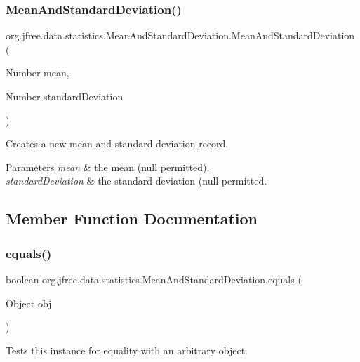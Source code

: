 \subsubsection{\texorpdfstring{Mean\+And\+Standard\+Deviation()}{MeanAndStandardDeviation()}\hspace{0.1cm}{\footnotesize\ttfamily [2/2]}}
{\footnotesize\ttfamily org.\+jfree.\+data.\+statistics.\+Mean\+And\+Standard\+Deviation.\+Mean\+And\+Standard\+Deviation (\begin{DoxyParamCaption}\item[{Number}]{mean,  }\item[{Number}]{standard\+Deviation }\end{DoxyParamCaption})}

Creates a new mean and standard deviation record.


\begin{DoxyParams}{Parameters}
{\em mean} & the mean ({\ttfamily null} permitted). \\
\hline
{\em standard\+Deviation} & the standard deviation ({\ttfamily null} permitted. \\
\hline
\end{DoxyParams}


\subsection{Member Function Documentation}
\mbox{\label{classorg_1_1jfree_1_1data_1_1statistics_1_1_mean_and_standard_deviation_a1525881f5d3fc6576a8b3c55b10eb145}} 
\subsubsection{\texorpdfstring{equals()}{equals()}}
{\footnotesize\ttfamily boolean org.\+jfree.\+data.\+statistics.\+Mean\+And\+Standard\+Deviation.\+equals (\begin{DoxyParamCaption}\item[{Object}]{obj }\end{DoxyParamCaption})}

Tests this instance for equality with an arbitrary object.


